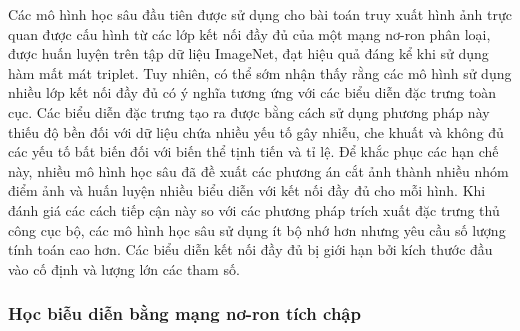 Các mô hình học sâu đầu tiên được sử dụng cho bài toán truy xuất hình ảnh trực quan được cấu hình từ các lớp kết nối đầy đủ\cite{razavian2014cnn, gong2014multiscale, babenko2014neural, deepindex, image-classification-retrieval, wang2014deep} của một mạng nơ-ron phân loại, được huấn luyện trên tập dữ liệu ImageNet\cite{russakovsky2015imagenet}, đạt hiệu quả đáng kể khi sử dụng hàm mất mát triplet\cite{wang2014deep, gomezojeda2015training}. Tuy nhiên, có thể sớm nhận thấy rằng các mô hình sử dụng nhiều lớp kết nối đầy đủ có ý nghĩa tương ứng với các biểu diễn đặc trưng toàn cục. Các biểu diễn đặc trưng tạo ra được bằng cách sử dụng phương pháp này thiếu độ bền đối với dữ liệu chứa nhiều yếu tố gây nhiễu, che khuất và không đủ các yếu tố bất biến đối với biến thể tịnh tiến và tỉ lệ. Để khắc phục các hạn chế này, nhiều mô hình học sâu đã đề xuất các phương án cắt ảnh thành nhiều nhóm điểm ảnh và huấn luyện nhiều biểu diễn với kết nối đầy đủ cho mỗi hình\cite{razavian2014cnn, babenko2014neural}. Khi đánh giá các cách tiếp cận này so với các phương pháp trích xuất đặc trưng thủ công cục bộ, các mô hình học sâu sử dụng ít bộ nhớ hơn nhưng yêu cầu số lượng tính toán cao hơn. Các biểu diễn kết nối đầy đủ bị giới hạn bởi kích thước đầu vào cố định và lượng lớn các tham số.

\subsubsection{Học biễu diễn bằng mạng nơ-ron tích chập}
